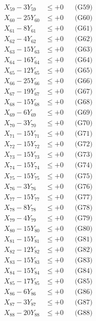 \documentclass[a4paper,10pt]{article}
\begin{document}
{\begin{align}
X_{59} - 3Y_{59} &\leq +0 && \text{(G59)} \\
X_{60} - 25Y_{60} &\leq +0 && \text{(G60)} \\
X_{61} - 8Y_{61} &\leq +0 && \text{(G61)} \\
X_{62} - 4Y_{62} &\leq +0 && \text{(G62)} \\
X_{63} - 15Y_{63} &\leq +0 && \text{(G63)} \\
X_{64} - 16Y_{64} &\leq +0 && \text{(G64)} \\
X_{65} - 12Y_{65} &\leq +0 && \text{(G65)} \\
\allowbreak
X_{66} - 25Y_{66} &\leq +0 && \text{(G66)} \\
X_{67} - 19Y_{67} &\leq +0 && \text{(G67)} \\
X_{68} - 15Y_{68} &\leq +0 && \text{(G68)} \\
X_{69} - 6Y_{69} &\leq +0 && \text{(G69)} \\
X_{70} - 3Y_{70} &\leq +0 && \text{(G70)} \\
X_{71} - 15Y_{71} &\leq +0 && \text{(G71)} \\
X_{72} - 15Y_{72} &\leq +0 && \text{(G72)} \\
X_{73} - 15Y_{73} &\leq +0 && \text{(G73)} \\
X_{74} - 15Y_{74} &\leq +0 && \text{(G74)} \\
X_{75} - 15Y_{75} &\leq +0 && \text{(G75)} \\
\allowbreak
X_{76} - 3Y_{76} &\leq +0 && \text{(G76)} \\
X_{77} - 15Y_{77} &\leq +0 && \text{(G77)} \\
X_{78} - 8Y_{78} &\leq +0 && \text{(G78)} \\
X_{79} - 4Y_{79} &\leq +0 && \text{(G79)} \\
X_{80} - 15Y_{80} &\leq +0 && \text{(G80)} \\
X_{81} - 15Y_{81} &\leq +0 && \text{(G81)} \\
X_{82} - 12Y_{82} &\leq +0 && \text{(G82)} \\
X_{83} - 15Y_{83} &\leq +0 && \text{(G83)} \\
X_{84} - 15Y_{84} &\leq +0 && \text{(G84)} \\
X_{85} - 17Y_{85} &\leq +0 && \text{(G85)} \\
\allowbreak
X_{86} - 6Y_{86} &\leq +0 && \text{(G86)} \\
X_{87} - 3Y_{87} &\leq +0 && \text{(G87)} \\
X_{88} - 20Y_{88} &\leq +0 && \text{(G88)} \\

\end{align}}
\end{document}
